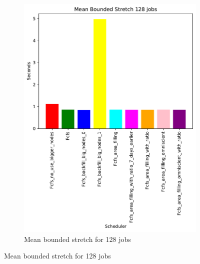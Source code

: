 \documentclass[a4paper]{article}
\begin{document}
\begin{figure}[H]
\begin{subfigure}[b]{0.4\linewidth}\centering\includegraphics[width=0.95\linewidth]{MBSS/plot/Size_Constraint_2022-01-17->2022-01-17_V10000_Mean_Stretch_With_a_Minimum_128_450_128_32_256_4_1024.pdf}\caption{Mean bounded stretch for 128 jobs}\label{45}\end{subfigure}

\end{figure}
\end{document}
